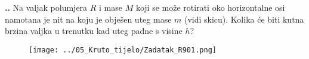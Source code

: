 

\noindent 
\textbf{
\thecjelina.\thezadatak.}
Na valjak polumjera $R$ i mase $M$ koji se može rotirati oko horizontalne osi namotana je nit na koju je obje\v{s}en uteg mase
$m$ (vidi skicu). Kolika će biti kutna brzina valjka u trenutku kad uteg padne s visine $h$?
\begin{figure}[h]%
  \begin{center}
    \texttt{[image: ../05\_Kruto\_tijelo/Zadatak\_R901.png]}
  \end{center}
\end{figure}


